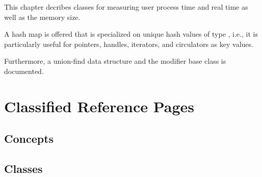 %
%
\label{chap:hash_map}


This chapter decribes classes for measuring user process time and real time
as well as the memory size.

A hash map  is offered that is specialized
on unique hash values of type , i.e., it is
particularly useful for pointers, handles, iterators, and circulators
as key values.

Furthermore, a union-find data structure and the modifier base class
is documented.

\section{Classified Reference Pages}

\subsection*{Concepts}


\subsection*{Classes}

 \\
 \\

\\



